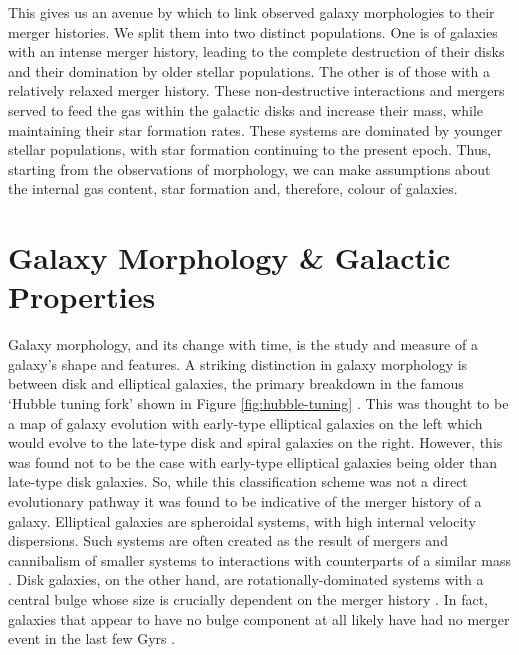 This gives us an avenue by which to link observed galaxy morphologies to their merger histories. We split them into two distinct populations. One is of galaxies with an intense merger history, leading to the complete destruction of their disks and their domination by older stellar populations. The other is of those with a relatively relaxed merger history. These non-destructive interactions and mergers served to feed the gas within the galactic disks and increase their mass, while maintaining their star formation rates. These systems are dominated by younger stellar populations, with star formation continuing to the present epoch. Thus, starting from the observations of morphology, we can make assumptions about the internal gas content, star formation and, therefore, colour of galaxies.

\section{Galaxy Morphology \& Galactic Properties}\label{galaxy-morphology}
\noindent Galaxy morphology, and its change with time, is the study and measure of a galaxy's shape and features. A striking distinction in galaxy morphology is between disk and elliptical galaxies, the primary breakdown in the famous `Hubble tuning fork' shown in Figure \ref{fig:hubble-tuning} \citep{1936rene.book.....H}. This was thought to be a map of galaxy evolution with early-type elliptical galaxies on the left which would evolve to the late-type disk and spiral galaxies on the right. However, this was found not to be the case with early-type elliptical galaxies being older than late-type disk galaxies. So, while this classification scheme was not a direct evolutionary pathway it was found to be indicative of the merger history of a galaxy. Elliptical galaxies are spheroidal systems, with high internal velocity dispersions. Such systems are often created as the result of mergers and cannibalism of smaller systems to interactions with counterparts of a similar mass \citep{1996MNRAS.283.1361B, 2006MNRAS.366..499D}. Disk galaxies, on the other hand, are rotationally-dominated systems with a central bulge whose size is crucially dependent on the merger history \citep{1992ApJ...393..484B, 2010ApJ...715..202H, 2017ApJ...837L...8B}. In fact, galaxies that appear to have no bulge component at all likely have had no merger event in the last few Gyrs \citep{2012ApJ...756...26M}.

